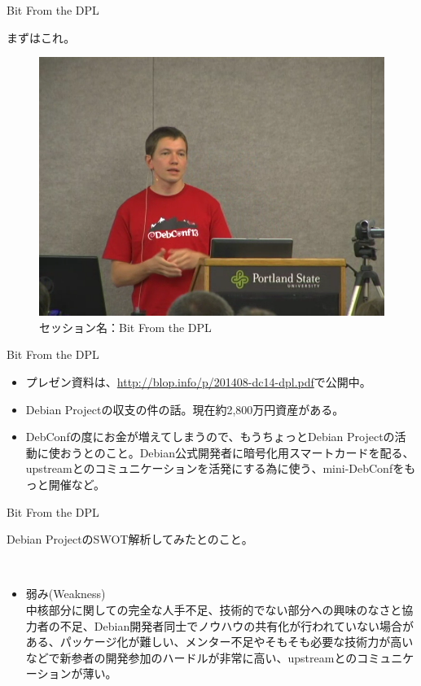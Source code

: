 \begin{frame}{Bit From the DPL}

 まずはこれ。

\begin{figure}[H]
\begin{center}
 \includegraphics[width=0.6\hsize]{image201409/bit_dpl.png}
\end{center}
\caption{セッション名：Bit From the DPL}
\end{figure}

\end{frame}

\begin{frame}{Bit From the DPL}

 \begin{itemize}
 \item プレゼン資料は、\url{http://blop.info/p/201408-dc14-dpl.pdf}で公開中。
 \item Debian Projectの収支の件の話。現在約2,800万円資産がある。
 \item DebConfの度にお金が増えてしまうので、もうちょっとDebian Projectの活動に使おうとのこと。Debian公式開発者に暗号化用スマートカードを配る、upstreamとのコミュニケーションを活発にする為に使う、mini-DebConfをもっと開催など。
 \end{itemize}

\end{frame}

\begin{frame}{Bit From the DPL}

  Debian ProjectのSWOT解析してみたとのこと。

　\begin{itemize}
   \item 弱み(Weakness) \\
中核部分に関しての完全な人手不足、技術的でない部分への興味のなさと協力者の不足、Debian開発者同士でノウハウの共有化が行われていない場合がある、パッケージ化が難しい、メンター不足やそもそも必要な技術力が高いなどで新参者の開発参加のハードルが非常に高い、upstreamとのコミュニケーションが薄い。
  \end{itemize}

\end{frame}

